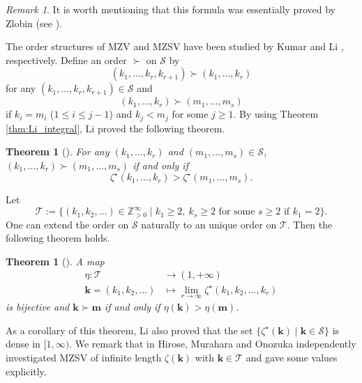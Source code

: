 \documentclass[12pt,a4paper]{article}
\newtheorem{thm}[defi]{Theorem}
\theoremstyle{remark}
\newtheorem{rem}[defi]{Remark}
\begin{document}
\begin{rem}
    It is worth mentioning that this formula was essentially proved by 
Zlobin (see \cite[Lemma 2]{Zlo}).
\end{rem}


The order structures of MZV 
and MZSV have been studied by
Kumar \cite{Ku} and Li
\cite{Li}, respectively.
Define an order $\succ$ on $\mathcal{S}$
by
\[ (k_1, \ldots, k_r, k_{r+1})
\succ (k_1, \ldots, k_r)
\]
for any $(k_1, \ldots, k_r, k_{r+1}) \in \mathcal{S}$
and 
\[ (k_1, \ldots, k_r)
\succ (m_1, \ldots, m_s)
\]
if $k_i=m_i$ ($1\le i \le j-1$) and 
$k_j<m_j$ for some $j\ge 1$. 
By using Theorem \ref{thm:Li_integral}, Li proved the following theorem.
\begin{thm}[{\cite[Theorem 1.2]{Li}}]
For any 
$ (k_1, \ldots, k_r)$ and 
$(m_1, \ldots, m_s) \in \mathcal{S}$,
$ (k_1, \ldots, k_r)\succ (m_1, \ldots, m_s) $
if and only if 
\[ \zeta^{\star}(k_1,\ldots ,k_r)
> \zeta^{\star}(m_1,\ldots ,m_s). \]
\end{thm}

Let 
\[
\mathcal{T}:=
\{ (k_1,k_2,\ldots )\in \mathbb{Z}_{>0}^{\infty} \mid
k_1\ge 2, \ k_s\ge 2 \text{ for some } s\ge 2 \text{ if } k_1=2
\} .
\]
One can extend the order on $\mathcal{S}$
naturally to an unique order on $\mathcal{T}$.
Then the following theorem holds.
\begin{thm}[{\cite[Theorem 1.3]{Li}}]
A map
\begin{align*}
\eta: \mathcal{T} &\longrightarrow (1, +\infty) \\
\boldsymbol{k} = (k_1,k_2,\ldots ) &\longmapsto 
\lim_{r\to\infty} \zeta^{\star}(k_1,k_2, \ldots , k_r)
\end{align*}
is bijective
and $\boldsymbol{k}\succ \boldsymbol{m}$
if and only if $\eta(\boldsymbol{k})> \eta(\boldsymbol{m})$.
\end{thm}
As a corollary of this theorem, Li also proved that 
the set $\{ \zeta^{\star}(\boldsymbol{k}) 
\mid \boldsymbol{k} \in \mathcal{S} \}$
is dense in $[1, \infty)$.
We remark that in \cite{HMO}
Hirose, Murahara and Onozuka
independently investigated MZSV of infinite length
$\zeta(\boldsymbol{k})$ with $\boldsymbol{k}\in
\mathcal{T}$ and 
gave some values explicitly.
\vspace{10pt}
\end{document}
